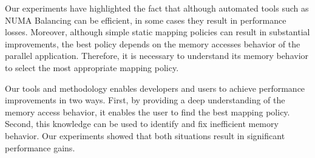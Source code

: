 Our experiments have highlighted the fact that although automated tools such
as NUMA Balancing can be efficient, in some cases they result in
performance losses. Moreover, although simple static mapping policies
can result in substantial improvements, the best policy depends on the memory
accesses behavior of the parallel application. Therefore, it is necessary to understand its memory behavior to
select the most appropriate mapping policy.

Our tools and methodology enables developers and users to achieve performance improvements in two ways. First, by
providing a deep understanding of the memory access behavior, it enables the user to
find the best mapping policy. Second, this knowledge can be used to
identify and fix inefficient memory behavior. Our experiments showed that both
situations result in significant performance gains.
